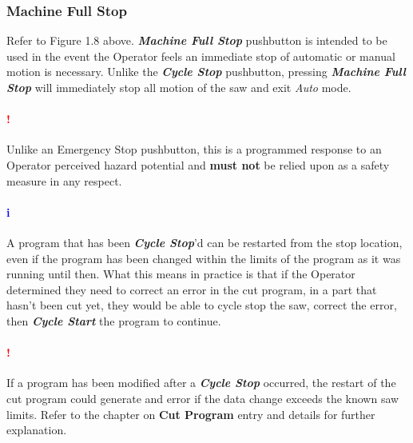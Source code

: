\subsubsection{Machine Full Stop} Refer to Figure 1.8 above. \textbf{\textit{Machine Full Stop}} pushbutton is intended to be used in the event the Operator feels an immediate stop of automatic or manual motion is necessary. Unlike the \textbf{\textit{Cycle Stop}} pushbutton, pressing \textbf{\textit{Machine Full Stop}} will immediately stop all motion of the saw and exit \textit{Auto} mode. 
\paragraph*{\textbf{{\LARGE \textcolor{red}{!}}}}Unlike an Emergency Stop pushbutton, this is a programmed response to an Operator perceived hazard potential and \textbf{must not} be relied upon as a safety measure in any respect.
\paragraph*{\textbf{\LARGE \textcolor{blue}{i}}} A program that has been \textbf{\textit{Cycle Stop}}'d can be restarted from the stop location, even if the program has been changed within the limits of the program as it was running until then. What this means in practice is that if the Operator determined they need to correct an error in the cut program, in a part that hasn't been cut yet, they would be able to cycle stop the saw, correct the error, then \textbf{\textit{Cycle Start}} the program to continue.
\paragraph*{\textbf{{\LARGE \textcolor{red}{!}}}} If a program has been modified after a \textbf{\textit{Cycle Stop}} occurred, the restart of the cut program could generate and error if the data change exceeds the known saw limits. Refer to the chapter on \textbf{Cut Program} entry and details for further explanation.